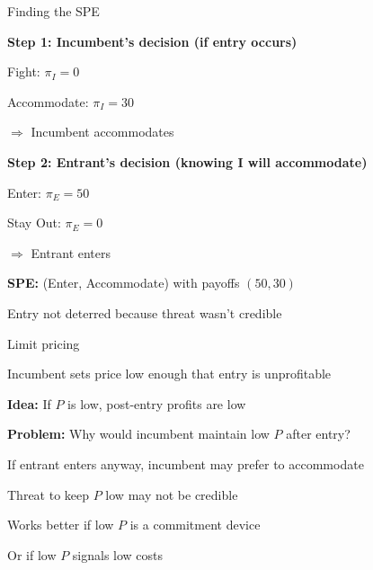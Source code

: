 \documentclass[notes,11pt, aspectratio=169]{beamer}
\newenvironment{wideitemize}{\itemize\addtolength{\itemsep}{10pt}}{\enditemize}
\begin{document}
\begin{frame}{Finding the SPE}
	\begin{wideitemize}
		\item \textbf{Step 1: Incumbent's decision (if entry occurs)}
		\begin{wideitemize}
			\vspace{5pt}
			\item Fight: $\pi_I = 0$
			\item Accommodate: $\pi_I = 30$
			\item $\Rightarrow$ Incumbent accommodates
		\end{wideitemize}
		\item \textbf{Step 2: Entrant's decision (knowing I will accommodate)}
		\begin{wideitemize}
			\vspace{5pt}
			\item Enter: $\pi_E = 50$
			\item Stay Out: $\pi_E = 0$
			\item $\Rightarrow$ Entrant enters
		\end{wideitemize}
		\item \textbf{SPE:} (Enter, Accommodate) with payoffs $(50, 30)$
		\item Entry not deterred because threat wasn't credible
	\end{wideitemize}
\end{frame}

\begin{frame}{Limit pricing}
	\begin{wideitemize}
		\item Incumbent sets price low enough that entry is unprofitable
		\item \textbf{Idea:} If $P$ is low, post-entry profits are low
		\item \textbf{Problem:} Why would incumbent maintain low $P$ after entry?
		\begin{wideitemize}
			\vspace{5pt}
			\item If entrant enters anyway, incumbent may prefer to accommodate
			\item Threat to keep $P$ low may not be credible
		\end{wideitemize}
		\item Works better if low $P$ is a commitment device
		\item Or if low $P$ signals low costs
	\end{wideitemize}
\end{frame}
\end{document}
